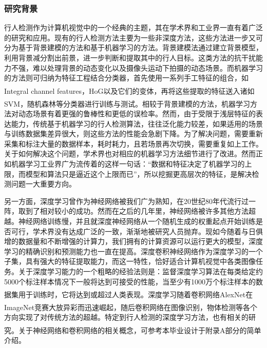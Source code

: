 \documentclass[12pt,a4paper,titlepage]{article}
\newcommand{\upcite}[1]{\textsuperscript{\textsuperscript{\cite{#1}}}}  %
\begin{document}
\subsubsection{研究背景}
行人检测作为计算机视觉中的一个经典的主题，其在学术界和工业界一直有着广泛的研究和应用。现有的行人检测方法主要为一些非深度方法，这些方法进一步又可分为基于背景建模的方法和基于机器学习的方法。背景建模法通过建立背景模型，利用背景减分割出前景，进一步判断和提取其中的行人目标。这类方法的抗干扰能力不强，难以处理背景的动态变化以及摄像头运动下拍摄的动态场景。而机器学习的方法则可归纳为特征工程结合分类器，首先使用一系列手工特征的组合，如Integral channel features\upcite{dollar2009integral}，HoG\upcite{dalal2005histograms}以及它们的变体\upcite{felzenszwalb2010object,schwartz2009human}，再将这些提取的特征送入诸如SVM\upcite{felzenszwalb2010object}，随机森林\upcite{dollar2012crosstalk}等分类器进行训练与测试。相较于背景建模的方法，机器学习方法对动态场景有着更强的鲁棒性和更低的误检率。然而，由于受限于浅层特征的表达能力，传统基于机器学习的行人检测算法，往往泛化能力较差，如果适用的场景与训练数据集差异很大，则这些方法的性能会急剧下降。为了解决问题，需要重新采集和标注大量的数据样本，耗时耗力，且若场景再次切换，需要重复如上工作。关于如何解决这个问题，学术界也对相应的机器学习方法细节进行了改进。然而正如机器学习工业界广为流传着的这样一句话：“数据和特征决定了机器学习的上限，而模型和算法只是逼近这个上限而已”，所以挖掘更高层次的特征，是解决检测问题一大重要方向。\par
另一方面，深度学习曾作为神经网络被我们广为熟知，在20世纪80年代流行过一阵，取到了相对较小的成功。然而在之后的几年里，神经网络被许多其他方法超越。神经网络训练慢，并且就深度神经网络从一个随机生成的权重起点开始训练是否可行，学术界没有达成广泛的一致，渐渐地被研究人员抛弃。现如今随着与日俱增的数据量和不断增强的计算力，我们拥有的计算资源可以运行更大的模型，深度学习的精确识别和预测能力也一直在提高。深度卷积神经网络作为深度学习的一个子集，具有强大的特征提取能力，而这一特性，恰好适合计算机视觉中各类图像任务。关于深度学习能力的一个粗略的经验法则是：监督深度学习算法在每类给定约5000个标注样本情况下一般将达到可接受的性能，当至少有1000万个标注样本的数据集用于训练时，它将达到或超过人类表现\upcite{Goodfellow-et-al-2016}。深度学习随着卷积网络AlexNet\upcite{krizhevsky2012imagenet}在ImageNet竞赛大放异彩而迅速崛起，随后卷积网络在图像识别\upcite{simonyan2014very,he2016deep}，物体检测\upcite{ren15fasterrcnn,redmon2016you,liu2016ssd}等各个方向实现了对传统方法的超越。特定到行人检测的深度学习方法，也有相关的研究\upcite{sermanet2013pedestrian}。关于神经网络和卷积网络的相关概念，可参考本毕业设计于附录A部分的简单介绍。
\end{document}
